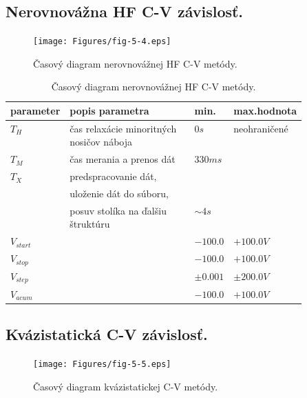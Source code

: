 \newpage
\subsection{Nerovnovážna HF C-V závislosť.}\label{sec:5.4.2}

\begin{figure}[h!]\centering
\texttt{[image: Figures/fig-5-4.eps]}
\captionsetup{justification=raggedright, singlelinecheck=false}
\caption[Časový diagram nerovnovážnej HF C-V metódy]{Časový diagram
  nerovnovážnej HF C-V metódy.}
\label{fig:5.4}
\end{figure}

\begin{table}[h!]\centering
\begin{tabular}{ l p{0.5\linewidth} l l }
\hline
parameter   & popis parametra & min. & max.hodnota \\
\hline
$T_H$  & čas relaxácie minoritných nosičov náboja \dotfill & $0 s$ &  neohraničené \\
$T_M$  & čas merania a prenos dát \dotfill & $330 ms$ \\
$T_X$  & predspracovanie dát, \\
       & uloženie dát do súboru, \\
       & posuv stolíka na ďalšiu štruktúru \dotfill & $\sim 4 s$ \\
$V_{start}$ & \dotfill & $-100.0$ & $+100.0 V$ \\
$V_{stop}$ & \dotfill & $-100.0$ & $+100.0 V$ \\
$V_{step}$ & \dotfill & $\pm 0.001$ & $\pm 200.0 V$ \\
$V_{acum}$ & \dotfill & $-100.0$ & $+100.0 V$ \\
\hline
\end{tabular}
\caption[Časový diagram nerovnovážnej HF C-V metódy]{Časový diagram
  nerovnovážnej HF C-V metódy.}
\label{tab:5.2}
\end{table}

\newpage
\subsection{Kvázistatická C-V závislosť.}\label{sec:5.4.3}

\begin{figure}[h!]\centering
\texttt{[image: Figures/fig-5-5.eps]}
\captionsetup{justification=raggedright, singlelinecheck=false}
\caption[Časový diagram kvázistatickej C-V metódy]{Časový diagram
  kvázistatickej C-V metódy.}
\label{fig:5.5}
\end{figure}

